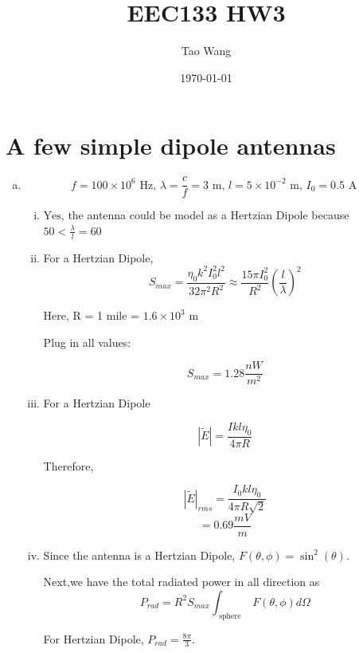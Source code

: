 \documentclass{article} %
\begin{document}
\title{EEC133 HW3}
\author{Tao Wang}
\date{\today}

\maketitle
\tableofcontents
\pagebreak

\section{A few simple dipole antennas}
\begin{enumerate}[(a)]
      \item
            \[f = 100 \times 10^6 \text{ Hz, } \lambda = \frac{c}{f} = 3 \text{ m, } l = 5 \times 10^{-2} \text{ m, } I_0 = 0.5 \text{ A }\]
            \begin{enumerate}[(i)]
                  \item $\boxed{\text{Yes}}$, the antenna could be model as a Hertzian Dipole because $50 < \frac{\lambda}{l} = 60$
                  \item For a Hertzian Dipole,
                        \[S_{max} = \frac{\eta_0 k^2 I_0 ^2 l^2}{32 \pi^2 R^2} \approx \frac{15 \pi I_0 ^2}{R^2}\left(\frac{l}{\lambda}\right)^2\]

                        Here, R = 1 mile = $1.6 \times 10^3 \text{ m}$

                        Plug in all values:

                        \[\boxed{S_{max} = 1.28 \si{\frac{nW}{m^2}}}\]
                  \item
                        For a Hertzian Dipole

                        \[|\widetilde{E}| = \frac{I k l \eta_0}{4 \pi R}\]

                        Therefore,

                        \[|\widetilde{E}|_{rms} = \frac{I_0 k l \eta_0}{4 \pi R \sqrt{2}}\]
                        \[= \boxed{0.69 \si{\frac{mV}{m}}}\]
                  \item
                        Since the antenna is a Hertzian Dipole, $F(\theta, \phi) = \sin^2(\theta)$.

                        Next,we have the total radiated power in all direction as
                        \[P_{rad} = R^2 S_{max}\int_{\text{ sphere }}  F(\theta, \phi) d\Omega\]

                        For Hertzian Dipole, $P_{rad} = \frac{8 \pi}{3}$.


\end{enumerate}
\end{enumerate}
\end{document}
